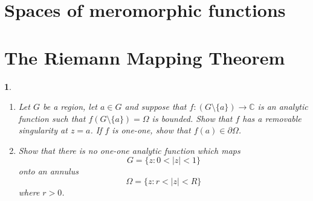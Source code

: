 \documentclass[12pt, a4paper]{report}
\theoremstyle{spaced}
\newtheorem{exercise}{}
\newcommand{\setexercise}[1]{\setcounter{exercise}{#1-1}}
\begin{document}
\section{Spaces of meromorphic functions}

\section{The Riemann Mapping Theorem}
\setexercise{2}
\begin{exercise}
	\begin{enumerate}[label=(\alph*)]
		\item Let $G$ be a region, let $a\in G$ and suppose that $f:(G\setminus\{a\})\to\mathbb{C}$ is an analytic function such that $f(G\setminus\{a\})=\Omega$ is bounded. Show that $f$ has a removable singularity at $z=a$. If $f$ is one-one, show that $f(a)\in\partial\Omega$.

		\item Show that there is no one-one analytic function which maps
		      \[
			      G=\{z:0<|z|<1\}
		      \]
		      onto an annulus
		      \[
			      \Omega=\{z:r<|z|<R\}
		      \]
		      where $r>0$.
	\end{enumerate}
\end{exercise}
\end{document}
